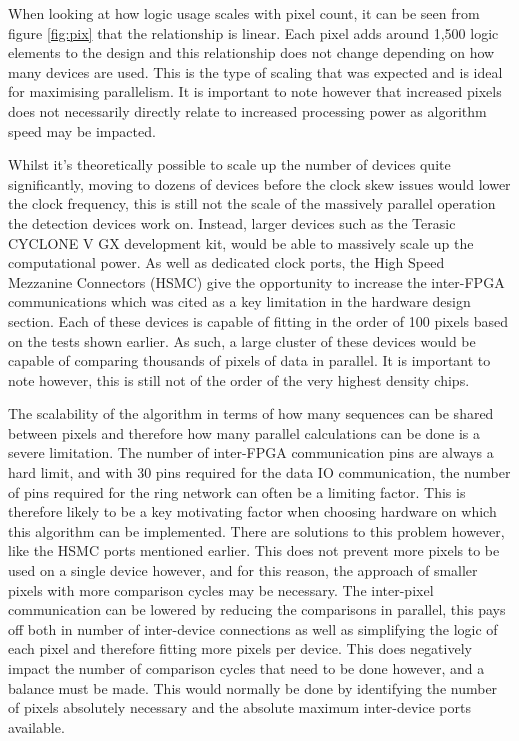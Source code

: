 When looking at how logic usage scales with pixel count, it can be seen from figure \ref{fig:pix} that the relationship is linear. Each pixel adds around 1,500 logic elements to the design and this relationship does not change depending on how many devices are used. This is the type of scaling that was expected and is ideal for maximising parallelism. It is important to note however that increased pixels does not necessarily directly relate to increased processing power as algorithm speed may be impacted.


Whilst it's theoretically possible to scale up the number of devices quite significantly, moving to dozens of devices before the clock skew issues would lower the clock frequency, this is still not the scale of the massively parallel operation the detection devices work on. Instead, larger devices such as the Terasic CYCLONE V GX development kit, would be able to massively scale up the computational power. As well as dedicated clock ports, the High Speed Mezzanine Connectors (HSMC) give the opportunity to increase the inter-FPGA communications which was cited as a key limitation in the hardware design section. Each of these devices is capable of fitting in the order of 100 pixels based on the tests shown earlier. As such, a large cluster of these devices would be capable of comparing thousands of pixels of data in parallel. It is important to note however, this is still not of the order of the very highest density chips. 

The scalability of the algorithm in terms of how many sequences can be shared between pixels and therefore how many parallel calculations can be done is a severe limitation. The number of inter-FPGA communication pins are always a hard limit, and with 30 pins required for the data IO communication, the number of pins required for the ring network can often be a limiting factor. This is therefore likely to be a key motivating factor when choosing hardware on which this algorithm can be implemented. There are solutions to this problem however, like the HSMC ports mentioned earlier. This does not prevent more pixels to be used on a single device however, and for this reason, the approach of smaller pixels with more comparison cycles may be necessary. The inter-pixel communication can be lowered by reducing the comparisons in parallel, this pays off both in number of inter-device connections as well as simplifying the logic of each pixel and therefore fitting more pixels per device. This does negatively impact the number of comparison cycles that need to be done however, and a balance must be made. This would normally be done by identifying the number of pixels absolutely necessary and the absolute maximum inter-device ports available. 


